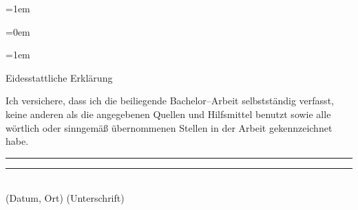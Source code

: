 \documentclass[a4paper,12pt]{article}
\newif\iflistoffigures
\newif\iflistoftables
\newif\ifacronym
\begin{document}
\renewcommand{\figurename}{Abb.}
\renewcommand{\tablename}{Tab.}
	
\parskip=1em
\parindent=0cm



\normalsize

\begin{spacing}{1.0} %
\parskip=0em
\newpage

\setcounter{tocdepth}{2}
\tableofcontents 
\newpage

\iflistoffigures
\listoffigures 
\newpage
\fi

\iflistoftables
\listoftables 
\newpage
\fi

\ifacronym

\fi

\parskip=1em
\end{spacing} 

\clearpage

\setcounter{romanPagenumber}{\value{page}} %


\pagestyle{fancy}
\fancyhead{}
\fancyhead[LO,RE]{\textsc{\Titel}}
\fancyhead[RO,LE]{\thepage}
\fancyfoot[CO,CE]{}
\setlength{\headheight}{15pt}



\begin{spacing}{1.5} %


\clearpage

\clearpage

\clearpage

\clearpage


\end{spacing}

\clearpage

\pagestyle{plain}
\setcounter{page}{\theromanPagenumber}
\renewcommand{\refname}{Literatur-- und Quellenverzeichnis}
%


\onehalfspacing
\clearpage

\pagestyle{empty} 
\thispagestyle{empty}

\begin{center}
{\Large Eidesstattliche Erklärung}
\vspace*{4cm}\end{center}
\noindent
Ich versichere, dass ich die beiliegende Bachelor--Arbeit selbstständig verfasst, keine anderen als die angegebenen Quellen und Hilfsmittel benutzt sowie alle wörtlich oder sinngemäß übernommenen Stellen in der Arbeit gekennzeichnet habe. 
\vspace{3cm}

\rule[0.5ex]{6.5cm}{1pt}
\hfill
\rule[0.5ex]{6.5cm}{1pt}
\\(Datum, Ort)
\hfill
(Unterschrift)
\end{document}

